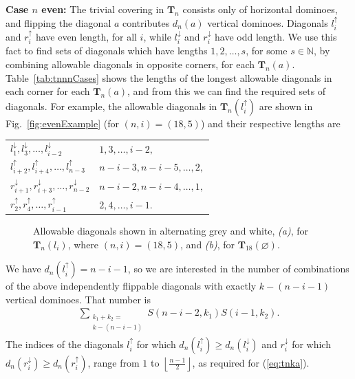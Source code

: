 \documentclass[12pt]{amsart}
\newcommand{\tabref}[1]{Table~\ref{tab:#1}}
\newcommand{\fref}[1]{Fig.~\ref{fig:#1}}
\newcommand\flr[2]{\left\lfloor \frac{#1}{#2} \right\rfloor}
\newcommand\ldown[1]{l_{#1}^\downarrow}
\newcommand\lup[1]{l_{#1}^\uparrow}
\newcommand\rdown[1]{r_{#1}^\downarrow}
\newcommand\rup[1]{r_{#1}^\uparrow}
\newcommand\ssum[1]{\sum_{ \substack{#1}}}
\newcommand{\Tn}[1]{\mathbf T_{#1}}
\begin{document}
\textbf{Case $n$ even:} The trivial covering in $\Tn{n}$ consists only
of horizontal dominoes, and flipping the diagonal $a$ contributes
$d_n(a)$ vertical dominoes.  Diagonals $\lup{i}$ and $\rup{i}$ have even
length, for all $i$, while $\ldown{i}$ and $\rdown{i}$ have odd
length.  We use this fact to find sets of diagonals which have lengths
$1,2,\ldots, s$, for some $s\in \mathbb N$, by combining allowable
diagonals in opposite corners, for each $\Tn{n}(a)$.
\tabref{tnnnCases} shows the lengths of the longest allowable diagonals in each
corner for each $\Tn{n}(a)$, and from this we can find the required
sets of diagonals.  For example, the allowable diagonals in
$\Tn{n}(\lup{i})$ are shown in \fref{evenExample} (for $(n,i)=(18,5)$)
and their respective lengths are
\begin{center}
  \begin{tabular}{ll}
  $    \ldown{1},\ldown{3}, \ldots, \ldown{i-2} $&$  1,3, \ldots, i-2,$\\
  $    \lup{i+2},\lup{i+4}, \ldots, \lup{n-3}$&$  n-i-3, n-i-5, \ldots, 2,$\\
  $    \rdown{i+1}, \rdown{i+3}, \ldots,\rdown{n-2}$&$ n-i-2, n-i-4,
  \ldots,1,$\\
  $    \rup{2}, \rup{4}, \ldots,\rup{i-1}$&$  2, 4, \ldots,i-1.$
\end{tabular}
\end{center}

\begin{figure}[h]
  \centering
  \hspace{0.00\textwidth}%
%  
  \caption{Allowable diagonals shown in alternating grey and white,
    \emph{(a)}, for $\Tn{n}(l_i)$, where $(n,i)=(18,5)$, and
    \emph{(b)}, for $\Tn{18}(\varnothing)$.}
\label{fig:evenTn}
\end{figure}

We have $d_n(\lup{i})=n-i-1$, so we are interested in the number of
combinations of the above independently flippable diagonals with exactly
$k-(n-i-1)$ vertical dominoes.  That number is
\begin{align*}
  \ssum{k_1+k_2 = \\k -(n-i-1)} S(n-i-2,k_1)S(i-1,k_2).
\end{align*}
The indices of the diagonals $\lup{i}$ for which $d_n(\lup{i}) \ge
d_n(\ldown{i})$ and $\rdown{i}$ for which $d_n(\rdown{i}) \ge
d_n(\rup{i})$, range from $1$ to $\flr{n-1}{2}$, as required for
(\ref{eq:tnka}).
\end{document}
